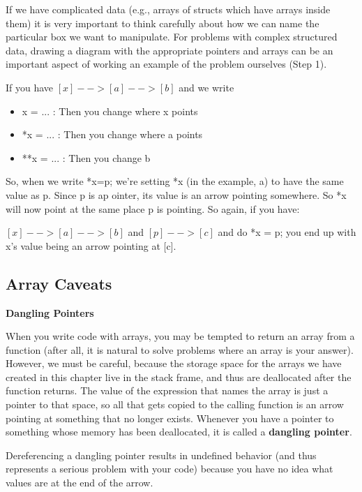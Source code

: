 \documentclass[11pt, a4paper]{article}
\begin{document}
If we have complicated data (e.g., arrays of structs which have arrays inside them) it is very important to think carefully about how we can name the particular box we want to manipulate. For problems with complex structured data, drawing a diagram with the appropriate pointers and arrays can be an important aspect of working an example of the problem ourselves (Step 1).



If you have $[x] --> [a] --> [b]$ and we write 
\begin{itemize}
  \item x = ... : Then you change where x points
  \item *x = ... : Then you change where a points
  \item **x = ... : Then you change b
\end{itemize}

So, when we write *x=p; we're setting *x (in the example, a) to have the same value as p. Since p is ap ointer, its value is an arrow pointing somewhere. So *x will now point at the same place p is pointing. So again, if you have:


$[x] --> [a] --> [b]$ and $[p]-->[c]$ and do *x = p; you end up with x's value being an arrow pointing at [c].




\subsection{Array Caveats}%
\label{sub:array_caveats}

\textbf{Dangling Pointers}



When you write code with arrays, you may be tempted to return an array from a function (after all, it is natural to solve problems where an array is your answer). However, we must be careful, because the storage space for the arrays we have created in this chapter live in the stack frame, and thus are deallocated after the function returns. The value of the expression that names the array is just a pointer to that space, so all that gets copied to the calling function is an arrow pointing at something that no longer exists. Whenever you have a pointer to something whose memory has been deallocated, it is called a \textbf{dangling pointer}.


Dereferencing a dangling pointer results in undefined behavior (and thus represents a serious problem with your code) because you have no idea what values are at the end of the arrow.
\end{document}
